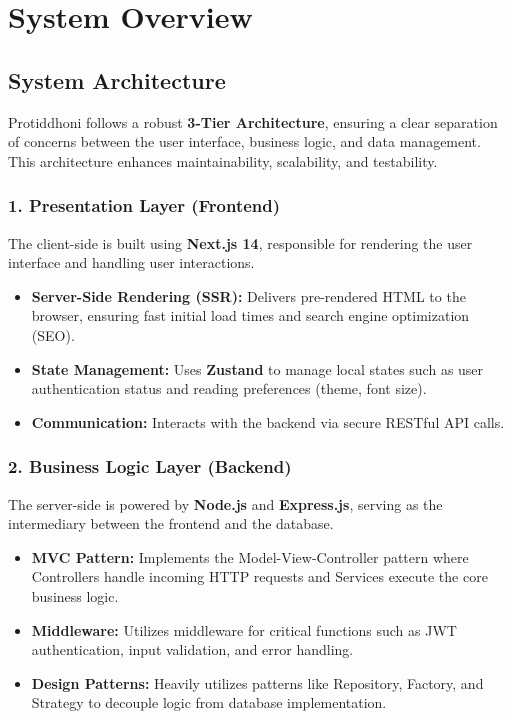 \section{System Overview}

\subsection{System Architecture}

Protiddhoni follows a robust \textbf{3-Tier Architecture}, ensuring a clear separation of concerns between the user interface, business logic, and data management. This architecture enhances maintainability, scalability, and testability.

\subsubsection*{1. Presentation Layer (Frontend)}
The client-side is built using \textbf{Next.js 14}, responsible for rendering the user interface and handling user interactions.
\begin{itemize}
    \item \textbf{Server-Side Rendering (SSR):} Delivers pre-rendered HTML to the browser, ensuring fast initial load times and search engine optimization (SEO).
    \item \textbf{State Management:} Uses \textbf{Zustand} to manage local states such as user authentication status and reading preferences (theme, font size).
    \item \textbf{Communication:} Interacts with the backend via secure RESTful API calls.
\end{itemize}

\subsubsection*{2. Business Logic Layer (Backend)}
The server-side is powered by \textbf{Node.js} and \textbf{Express.js}, serving as the intermediary between the frontend and the database.
\begin{itemize}
    \item \textbf{MVC Pattern:} Implements the Model-View-Controller pattern where Controllers handle incoming HTTP requests and Services execute the core business logic.
    \item \textbf{Middleware:} Utilizes middleware for critical functions such as JWT authentication, input validation, and error handling.
    \item \textbf{Design Patterns:} Heavily utilizes patterns like Repository, Factory, and Strategy to decouple logic from database implementation.
\end{itemize}


